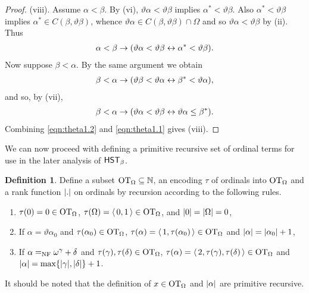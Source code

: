 \documentclass[UKenglish,cleveref,DIV=12]{scrartcl}
\theoremstyle{definition}
\newtheorem{definition}[lemma]{Definition}
\theoremstyle{definition}
\begin{document}
\begin{proof}
(viii). Assume $\alpha<\beta$. By (vi), $\vartheta\alpha<\vartheta\beta$ implies $\alpha^*<\vartheta\beta$. Also $\alpha^*<\vartheta\beta$ implies $\alpha^*\in C(\beta,\vartheta\beta)$, whence $\vartheta\alpha\in C(\beta,\vartheta\beta)\cap \Omega$ and so $\vartheta\alpha<\vartheta\beta$ by (ii). Thus
\begin{align}\label{eqn:theta1.1}
 \alpha<\beta\rightarrow(\vartheta\alpha<\vartheta\beta \leftrightarrow \alpha^*<\vartheta\beta).
\end{align}
Now suppose $\beta<\alpha$. By the same argument we obtain
\begin{align*}
 \beta<\alpha \rightarrow(\vartheta\beta<\vartheta\alpha \leftrightarrow \beta^*<\vartheta\alpha),
\end{align*}
and so, by (vii),
\begin{align}\label{eqn:theta1.2}
 \beta<\alpha \rightarrow(\vartheta\alpha<\vartheta\beta \leftrightarrow \vartheta\alpha\le\beta^*).
\end{align}
Combining \eqref{eqn:theta1.2} and \eqref{eqn:theta1.1} gives (viii).
%
\end{proof}
We can now proceed with defining a primitive recursive set of ordinal terms for
use in the later analysis of $\mathsf{HST}_\beta$.
\begin{definition} Define a subset $\mathrm{OT}_\Omega\subseteq\mathbb N$, an encoding $\tau$
of ordinals into $\mathrm{OT}_\Omega$ and a rank function $\lvert{.}\rvert$ on ordinals by
recursion according to the following rules.
\begin{enumerate}%
 \item $\tau(0)=0\in\mathrm{OT}_\Omega$, $\tau(\Omega)=\langle\,0,1\,\rangle\in\mathrm{OT}_\Omega$, and $\lvert{0}\rvert=\lvert{\Omega}\rvert=0$,
 \item If $\alpha=\vartheta\alpha_0$ and $\tau(\alpha_0)\in\mathrm{OT}_\Omega$, $\tau(\alpha)=\langle\,1,\tau(\alpha_0)\,\rangle\in\mathrm{OT}_\Omega$ and $\lvert{\alpha}\rvert=\lvert{\alpha_0}\rvert+1$,
 \item If $\alpha=_{\mathrm{NF}}\omega^\gamma+\delta$ and $\tau(\gamma),\tau(\delta)\in\mathrm{OT}_\Omega$, $\tau(\alpha)=\langle\,2,\tau(\gamma),\tau(\delta)\,\rangle\in\mathrm{OT}_\Omega$ and $\lvert{\alpha}\rvert=\max\{\lvert{\gamma}\rvert,\lvert{\delta}\rvert\}+1$.
\end{enumerate}
\end{definition}
It should be noted that the definition of $x\in\mathrm{OT}_\Omega$ and $\lvert{\alpha}\rvert$ are primitive recursive.
\end{document}

